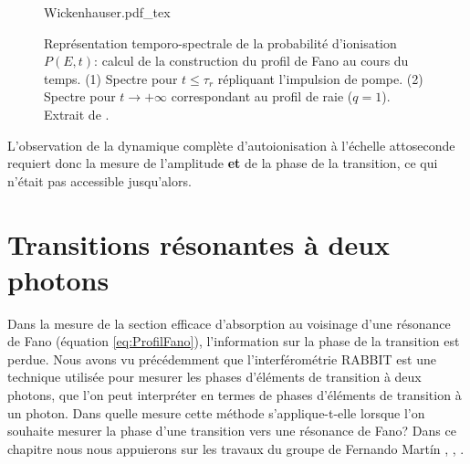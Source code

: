 \begin{figure}[h]
\centering
\def\svgwidth{0.6\textwidth}
{Wickenhauser.pdf_tex}
\caption{Représentation temporo-spectrale de la probabilité d'ionisation $P(E, t)$: calcul de la construction du profil de Fano au cours du temps. (1) Spectre pour $t \leq \tau_r$ répliquant l'impulsion de pompe. (2) Spectre pour $t \rightarrow + \infty$ correspondant au profil de raie ($q = 1$). Extrait de .}
\label{fig:Wickenhauser}
\end{figure}

L'observation de la dynamique complète d'autoionisation à l'échelle attoseconde requiert donc la mesure de l'amplitude \textbf{et} de la phase de la transition, ce qui n'était pas accessible jusqu'alors.

\chapter{Transitions résonantes à deux photons}
\label{chap:2photons_et_Fano}
Dans la mesure de la section efficace d'absorption au voisinage d'une résonance de Fano (équation \ref{eq:ProfilFano}), l'information sur la phase de la transition est perdue. Nous avons vu précédemment que l'interférométrie RABBIT est une technique utilisée pour mesurer les phases d'éléments de transition à deux photons, que l'on peut interpréter en termes de phases d'éléments de transition à un photon. Dans quelle mesure cette méthode s'applique-t-elle lorsque l'on souhaite mesurer la phase d'une transition vers une résonance de Fano? Dans ce chapitre nous nous appuierons sur les travaux du groupe de Fernando Mart\'{i}n , , .

